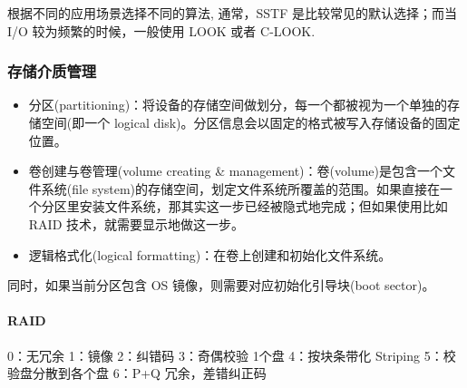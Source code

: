 根据不同的应用场景选择不同的算法, 通常，SSTF 是比较常见的默认选择；而当 I/O 较为频繁的时候，一般使用 LOOK 或者 C-LOOK. 

\subsubsection{存储介质管理}
\begin{itemize}
    \item 分区(partitioning)：将设备的存储空间做划分，每一个都被视为一个单独的存储空间(即一个 logical disk)。分区信息会以固定的格式被写入存储设备的固定位置。
    \item 卷创建与卷管理(volume creating \& management)：卷(volume)是包含一个文件系统(file system)的存储空间，划定文件系统所覆盖的范围。如果直接在一个分区里安装文件系统，那其实这一步已经被隐式地完成；但如果使用比如 RAID 技术，就需要显示地做这一步。
    \item 逻辑格式化(logical formatting)：在卷上创建和初始化文件系统。
\end{itemize}
同时，如果当前分区包含 OS 镜像，则需要对应初始化引导块(boot sector)。


\paragraph{RAID}0：无冗余 1：镜像 2：纠错码 3：奇偶校验 1个盘 4：按块条带化 Striping 5：校验盘分散到各个盘 6：P+Q 冗余，差错纠正码